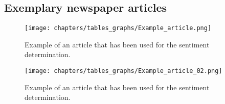 
\subsection{Exemplary newspaper articles}
%

\begin{figure}[!h]
	\centering
	\texttt{[image: chapters/tables\_graphs/Example\_article.png]} 
	\caption{Example of an article that has been used for the sentiment determination.}
	\label{fig:ExArticle_1}
\end{figure}
%
\begin{figure}[!h]
	\centering
	\texttt{[image: chapters/tables\_graphs/Example\_article\_02.png]} 
	\caption{Example of an article that has been used for the sentiment determination.}
	\label{fig:ExArticle_2}
\end{figure}
%

\newpage
